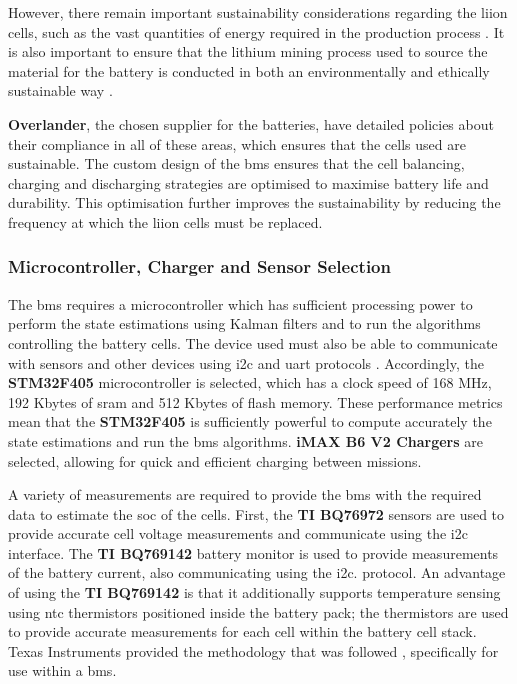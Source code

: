 However, there remain important sustainability considerations regarding the \acrshort{liion} cells, such as the vast quantities of energy required in the production process \cite{environments12010024}. It is also important to ensure that the lithium mining process used to source the material for the battery is conducted in both an environmentally and ethically sustainable way \cite{EnergyFuturesLab_2022}. 

\textbf{Overlander}, the chosen supplier for the batteries, have detailed policies about their compliance in all of these areas, which ensures that the cells used are sustainable. The custom design of the \gls{bms} ensures that the cell balancing, charging and discharging strategies are optimised to maximise battery life and durability. This optimisation further improves the sustainability by reducing the frequency at which the \acrshort{liion} cells must be replaced.

\subsubsection{Microcontroller, Charger and Sensor Selection}
\label{microcon}

The \acrshort{bms} requires a microcontroller which has sufficient processing power to perform the state estimations using Kalman filters and to run the algorithms controlling the battery cells. The device used must also be able to communicate with sensors and other devices using \gls{i2c} and \gls{uart} protocols \cite{Denggao2022}. Accordingly, the \textbf{STM32F405} microcontroller is selected, which has a clock speed of 168 MHz, 192 Kbytes of \gls{sram} and 512 Kbytes of flash memory. These performance metrics mean that the \textbf{STM32F405} is sufficiently powerful to compute accurately the state estimations and run the \acrshort{bms} algorithms. \textbf{iMAX B6 V2 Chargers} are selected, allowing for quick and efficient charging between missions.

A variety of measurements are required to provide the \acrshort{bms} with the required data to estimate the \gls{soc} of the cells. First, the \textbf{TI BQ76972} sensors are used to provide accurate cell voltage measurements and communicate using the \acrshort{i2c} interface. The \textbf{TI BQ769142} battery monitor is used to provide measurements of the battery current, also communicating using the \acrshort{i2c}. protocol. An advantage of using the \textbf{TI BQ769142} is that it additionally supports temperature sensing using \gls{ntc} thermistors positioned inside the battery pack; the thermistors are used to provide accurate measurements for each cell within the battery cell stack. Texas Instruments provided the methodology that was followed \cite{TI_SNIA032}, specifically for use within a \gls{bms}.

